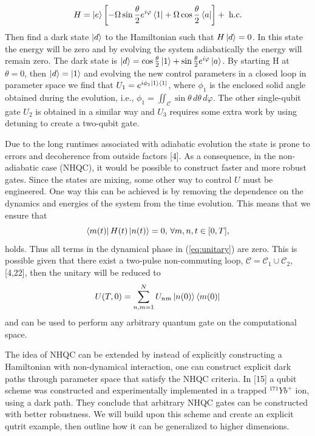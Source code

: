 \begin{equation}
H  = \ket{e}\left[-\Omega\sin\frac{\theta}{2}e^{i\varphi}\bra{1} + \Omega\cos\frac{\theta}{2}\bra{a}\right] + \;\text{h.c}.
\end{equation}
Then find a dark state $\ket{d}$ to the Hamiltonian such that $H\ket{d} = 0$. In this state the energy will be zero and by evolving the system adiabatically the energy will remain zero. The dark state is $\ket{d} = \cos\frac{\theta}{2}\ket{1} + \sin\frac{\theta}{2}e^{i\varphi}\ket{a}$. By starting H at $\theta = 0$, then $\ket{d} = \ket{1}$ and evolving the new control parameters in a closed loop in parameter space we find that $U_1 = e^{i\phi_1\ket{1}\bra{1}}$,  where $\phi_1$ is the enclosed solid angle obtained during the evolution, i.e., $\phi_1 = \iint_{\mathcal{C}} \sin\theta\, d\theta \,d\varphi$. The other single-qubit gate $U_2$ is obtained in a similar way and $U_3$ requires some extra work by using detuning to create a two-qubit gate.


Due to the long runtimes associated with adiabatic evolution the state is prone to errors and decoherence from outside factors [4]. As a consequence, in the non-adiabatic case (NHQC), it would be possible to construct faster and more robust gates. Since the states are mixing, some other way to control $U$ must be engineered. One way this can be achieved is by removing the dependence on the dynamics and energies of the system from the time evolution. This means that we ensure that 
\begin{equation}
\bra{m(t)}H(t)\ket{n(t)} = 0,\,\forall m,n, t\in[0,T],
\end{equation} 
holds. Thus all terms in the dynamical phase in (\ref{eq:unitary}) are zero.
This is possible given that there exist a two-pulse non-commuting loop, $\mathcal{C} = \mathcal{C}_1 \cup \mathcal{C}_2$, [4,22], 
then the unitary will be reduced to 
\begin{equation}
U(T,0) = \sum_{n,m = 1}^{N} U_{nm}\ket{n(0)}\bra{m(0)}
\end{equation}
and can be used to perform any arbitrary quantum gate on the computational space.

The idea of NHQC can be extended by instead of explicitly constructing a Hamiltonian with non-dynamical interaction, one can construct explicit dark paths through parameter space that satisfy the NHQC criteria. In [15] a qubit scheme was constructed and experimentally implemented in a trapped $^{171}Yb^{+}$ ion, using a dark path. They conclude that arbitrary NHQC gates can be constructed with better robustness. We will build upon this scheme and create an explicit qutrit example, then outline how it can be generalized to higher dimensions.

